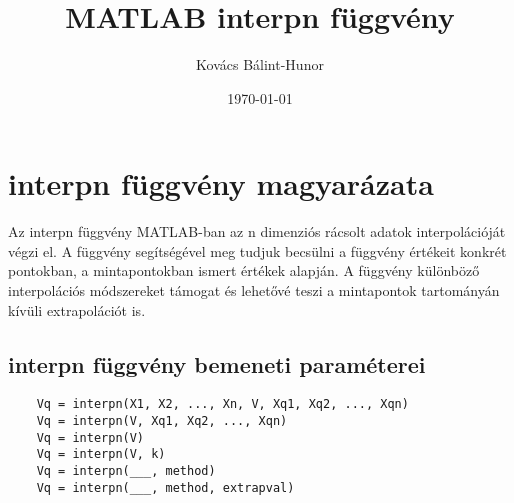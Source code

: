 \documentclass{article}
\title{MATLAB interpn függvény}
\author{Kovács Bálint-Hunor}
\date{\today}
\begin{document}
\maketitle

\section{\textbf{interpn} függvény magyarázata} Az interpn függvény MATLAB-ban az n dimenziós rácsolt
adatok interpolációját végzi el. A függvény segítségével meg tudjuk becsülni a
függvény értékeit konkrét pontokban, a mintapontokban ismert értékek alapján. A
függvény különböző interpolációs módszereket támogat és lehetővé teszi a
mintapontok tartományán kívüli extrapolációt is.

\subsection{\textbf{interpn} függvény bemeneti paraméterei}
\begin{verbatim}
    Vq = interpn(X1, X2, ..., Xn, V, Xq1, Xq2, ..., Xqn)
    Vq = interpn(V, Xq1, Xq2, ..., Xqn)
    Vq = interpn(V)
    Vq = interpn(V, k)
    Vq = interpn(___, method)
    Vq = interpn(___, method, extrapval)
\end{verbatim}
\end{document}
